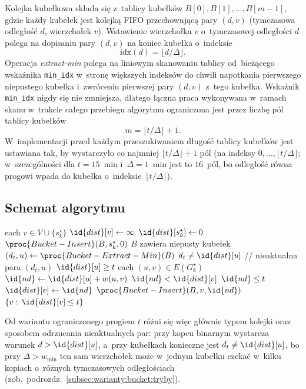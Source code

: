 Kolejka kubełkowa składa się z~tablicy kubełków
$B[0], B[1],\dots, B[m-1]$, gdzie każdy kubełek jest kolejką FIFO
przechowującą pary $(d,v)$ (tymczasowa odległość $d$, wierzchołek $v$).
Wstawienie wierzchołka $v$ o~tymczasowej odległości $d$ polega na dopisaniu
pary $(d,v)$ na koniec kubełka o~indeksie
\[
\mathrm{idx}(d)=\lfloor d/\Delta\rfloor.
\]
Operacja \emph{extract-min} polega na liniowym skanowaniu tablicy
od~bieżącego wskaźnika \texttt{min\_idx} w~stronę większych indeksów do
chwili napotkania pierwszego niepustego kubełka i~zwróceniu pierwszej pary
$(d,v)$ z~tego kubełka.
Wskaźnik \texttt{min\_idx} nigdy się nie zmniejsza, dlatego łączna
praca wykonywana w~ramach skanu w~trakcie całego przebiegu algorytmu
ograniczona jest przez liczbę pól tablicy kubełków
\[
m=\lfloor t/\Delta\rfloor+1.
\]
W~implementacji przed każdym przeszukiwaniem długość tablicy kubełków jest
ustawiana tak, by wystarczyło co najmniej \(\lfloor t/\Delta\rfloor+1\) pól
(na indeksy \(0,\dots,\lfloor t/\Delta\rfloor\); w~szczególności dla
$t=15$~min i~$\Delta=1$~min jest to $16$~pól, bo odległość równa progowi
wpada do kubełka o~indeksie~$\lfloor t/\Delta\rfloor$).

\subsection{Schemat algorytmu}
\label{subsec:warianty:bucket:schemat}

\begin{codebox}
\li \For each $v\in V\cup\{s^\star_k\}$
\li \Do $\id{dist}[v]\gets\infty$ \End
\li $\id{dist}[s^\star_k]\gets 0$
\li $\proc{Bucket-Insert}(B, s^\star_k, 0)$
\li \While $B$ zawiera niepusty kubełek
\li \Do $(d_t,u)\gets\proc{Bucket-Extract-Min}(B)$
\li     \If $d_t \neq \id{dist}[u]$
\li     \Then {}                            \quad // nieaktualna para $(d_t,u)$
        \End
\li     \If $\id{dist}[u]\ge t$
\li     \Then {}
        \End
\li     \For each $(u,v)\in E(G^\star_k)$
\li     \Do $\id{nd}\gets \id{dist}[u] + w(u,v)$
\li         \If $\id{nd}<\id{dist}[v]$  $\id{nd}\le t$
\li         \Then $\id{dist}[v]\gets\id{nd}$
\li             $\proc{Bucket-Insert}(B,v,\id{nd})$
            \End
        \End
    \End
\li \Return $\{v:\,\id{dist}[v]\le t\}$
\end{codebox}

Od wariantu ograniczonego progiem $t$ różni się więc głównie typem kolejki
oraz sposobem odrzucania nieaktualnych par: przy kopcu binarnym wystarcza
warunek $d>\id{dist}[u]$, a~przy kubełkach konieczne jest $d_t\neq\id{dist}[u]$,
bo przy $\Delta>w_{\min}$ ten sam wierzchołek może w~jednym kubełku czekać
w~kilku kopiach o~różnych tymczasowych odległościach (zob.\ podrozdz.\
\ref{subsec:warianty:bucket:tryby}).

